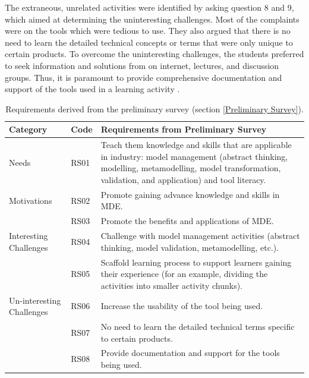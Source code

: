 \documentclass[12pt, a4paper]{report}
\begin{document}
{The extraneous, unrelated activities were identified by asking question 8 and 9, which aimed at determining the uninteresting challenges. Most of the complaints were on the tools which were tedious to use. They also argued that there is no need to learn the detailed technical concepts or terms that were only unique to certain products. To overcome the uninteresting challenges, the students preferred to seek information and solutions from on internet, lectures, and discussion groups. Thus, it is paramount to provide comprehensive documentation and support of the tools used in a learning activity \cite{liebel2015ready}. 

\begin{table}[ht]
\caption{Requirements derived from the preliminary survey (section \ref{Preliminary Survey}).}
\label{table:preliminary-survey}
\begin{center}
\begin{tabular}{ p{2cm}p{1cm}p{10cm} } 
\hline
Category & Code & Requirements from Preliminary Survey \\
\hline
\multirow{1}{2cm}{Needs} 
& RS01 & Teach them knowledge and skills that are applicable in industry: model management (abstract thinking, modelling, metamodelling, model transformation, validation, and application) and tool literacy. \\ 
\hline
\multirow{1}{2cm}{Motivations}
& RS02 & Promote gaining advance knowledge and skills in MDE. \\ 
& RS03 & Promote the benefits and applications of MDE. \\ 
\hline
\multirow{1}{2cm}{Interesting Challenges}
& RS04 & Challenge with model management activities (abstract thinking, model validation, metamodelling, etc.). \\ 
& RS05 & Scaffold learning process to support learners gaining their experience (for an example, dividing the activities into smaller activity chunks). \\ 
\hline
\multirow{1}{2cm}{Un-interesting Challenges}
& RS06 & Increase the usability of the tool being used. \\ 
& RS07 & No need to learn the detailed technical terms specific to certain products. \\ 
& RS08 & Provide documentation and support for the tools being used. \\ 
\hline
\end{tabular}
\end{center}
\end{table}

}
\end{document}
